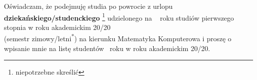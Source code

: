 \documentclass{wmiisubmission}
\begin{document}
\cracowdate
{}
\studentaddress
\addressee{\piotrniemiec}

\vskip 3.0cm


\vskip 0.5cm

Oświadczam, że podejmuję studia po powrocie z urlopu
\textbf{dziekańskiego/studenckiego}
\footnote[1]{niepotrzebne skreślić} udzielonego na \dotfill~ roku
studiów pierwszego stopnia w roku akademickim
20\fillField{0.7cm}/20\fillField{0.7cm}\\
(semestr zimowy/letni\textsuperscript{*})
na kierunku Matematyka Komputerowa i proszę o wpisanie mnie na listę studentów
\fillField{3cm}
~roku w roku akademickim 20\fillField{0.7cm}/20\fillField{0.7cm}.

\vskip 2.0cm

\studentsignature
\end{document}

